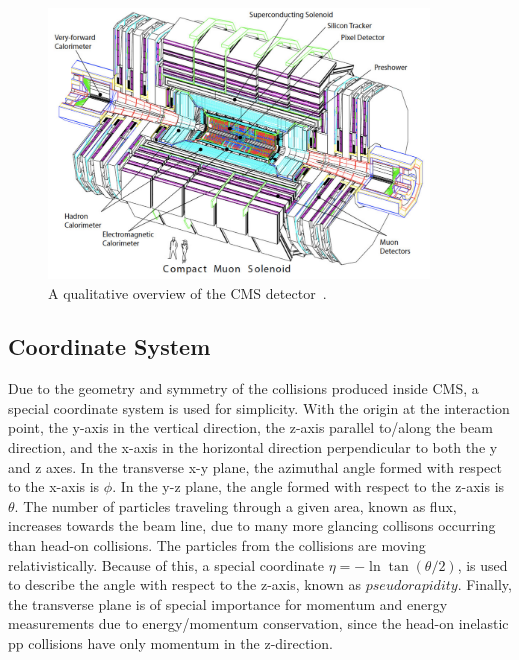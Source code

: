 \begin{figure}[hbtp]
 \begin{center}
   \includegraphics[width=0.9\textwidth]{ch3_figs/cms_overview_white.pdf}
   \caption[Overview of the CMS detector]{A qualitative overview of the CMS detector~\cite{cms_bluebook}.\label{fig:cms_overview}}
 \end{center}
\end{figure}

\subsection{Coordinate System}
Due to the geometry and symmetry of the collisions produced inside CMS, a special coordinate system is used for simplicity. With the origin at the interaction point,
the y-axis in the vertical direction, the z-axis parallel to/along the beam direction, and the x-axis in the horizontal direction perpendicular to both the y
and z axes. In the transverse x-y plane, the azimuthal angle formed with respect to the x-axis is $\phi$. In the y-z plane, the angle formed with respect to the z-axis
is $\theta$. The number of particles traveling through a given area, known as flux, increases towards the beam line, due to many more glancing collisons occurring
than head-on collisions. The particles from the collisions are moving relativistically. Because of this, a special coordinate $\eta = -\ln\tan(\theta/2)$, 
is used to describe the angle with respect to the z-axis, known as $pseudorapidity$. 
Finally, the transverse plane is of special importance for momentum and energy measurements due to energy/momentum conservation, since the head-on inelastic
pp collisions have only momentum in the z-direction.

